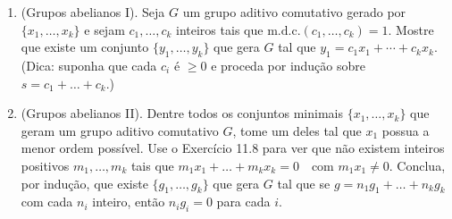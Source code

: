 \begin{enumerate}[label=11.\arabic*.]
    \item (Grupos abelianos I). Seja $G$ um grupo aditivo comutativo gerado por $\{x_1, \ldots, x_k\}$ 
    e sejam $c_1, \ldots, c_k$ inteiros tais que $\mathrm{m.d.c.}(c_1, \ldots, c_k) = 1$. Mostre que existe um conjunto 
    $\{y_1, \ldots, y_k\}$ que gera $G$ tal que $y_1 = c_1x_1 + \cdots + c_kx_k$.
    \\ (Dica: suponha que cada $c_i$ é $\geq 0$ e proceda por indução sobre $s = c_1 + \ldots + c_k$.)

    \item (Grupos abelianos II). Dentre todos os conjuntos minimais $\{x_1, \ldots, x_k\}$ que geram um grupo aditivo 
    comutativo $G$, tome um deles tal que $x_1$ possua a menor ordem possível. Use o Exercício 11.8 para ver que não 
    existem inteiros positivos $m_1, \ldots, m_k$ tais que $m_1x_1 + \ldots + m_kx_k = 0 \quad \text{com } m_1x_1 \neq 0.$
    Conclua, por indução, que existe $\{g_1, \ldots, g_k\}$ que gera $G$ tal que se 
    $g = n_1 g_1 + \ldots + n_k g_k$ com cada $n_i$ inteiro, então $n_i g_i = 0$ para cada $i$.

\end{enumerate}
